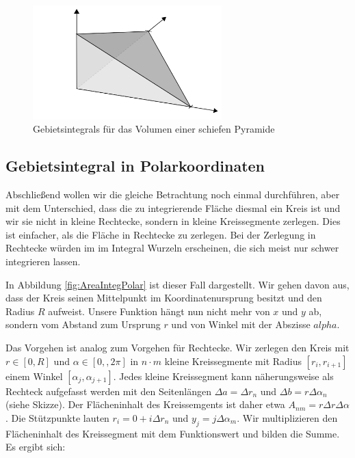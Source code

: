 \begin{figure}
    \centering
    \includegraphics[width=0.65\textwidth]{./svg/integral-tetraeder}
    \caption{Gebietsintegrals für das Volumen einer schiefen Pyramide}
    \label{fig:AreaIntegTetraeder}
\end{figure}

\subsection{Gebietsintegral in Polarkoordinaten}

Abschließend wollen wir die gleiche Betrachtung noch einmal durchführen, aber mit dem Unterschied, dass die zu integrierende Fläche diesmal ein Kreis ist und wir sie nicht in kleine Rechtecke, sondern in kleine Kreissegmente zerlegen. Dies ist einfacher, als die Fläche in Rechtecke zu zerlegen. Bei der Zerlegung in Rechtecke würden im im Integral Wurzeln erscheinen, die sich meist nur schwer integrieren lassen.


In Abbildung \ref{fig:AreaIntegPolar} ist dieser Fall dargestellt. Wir gehen davon aus, dass der Kreis seinen Mittelpunkt im Koordinatenursprung besitzt und den Radius $R$ aufweist. Unsere Funktion hängt nun nicht mehr von $x$ und $y$ ab, sondern vom Abstand zum Ursprung $r$ und von Winkel mit der Abszisse $alpha$.

Das Vorgehen ist analog zum Vorgehen für Rechtecke. Wir zerlegen den Kreis mit $r\in[0,R]$ und $\alpha\in[0,,2\pi]$ in $n\cdot m$ kleine Kreissegmente mit Radius $[r_i, r_{i+1}]$ einem Winkel $[\alpha_j, \alpha_{j+1}]$. Jedes kleine Kreissegment kann näherungsweise als Rechteck aufgefasst werden mit den Seitenlängen $\Delta a = \Delta r_n$ und $\Delta b = r \Delta \alpha_n$ (siehe Skizze). Der Flächeninhalt des Kreissemgents ist daher etwa $A_{nm} = r \Delta r \Delta \alpha$. Die Stützpunkte lauten $r_i = 0 + i \Delta r_n$ und $y_j = j \Delta \alpha_m$. Wir multiplizieren den Flächeninhalt des Kreissegment mit dem Funktionswert und bilden die Summe. Es ergibt sich:

